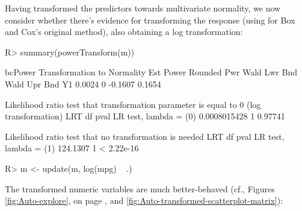 \documentclass[
]{jss}
\begin{document}
Having transformed the predictors towards multivariate normality, we now
consider whether there's evidence for transforming the response (using
 for Box and Cox's original method), also
obtaining a log transformation:

\begin{CodeChunk}
\begin{CodeInput}
R> summary(powerTransform(m))
\end{CodeInput}
\begin{CodeOutput}
bcPower Transformation to Normality 
   Est Power Rounded Pwr Wald Lwr Bnd Wald Upr Bnd
Y1    0.0024           0      -0.1607       0.1654

Likelihood ratio test that transformation parameter is equal to 0
 (log transformation)
                               LRT df    pval
LR test, lambda = (0) 0.0008015428  1 0.97741

Likelihood ratio test that no transformation is needed
                           LRT df       pval
LR test, lambda = (1) 124.1307  1 < 2.22e-16
\end{CodeOutput}
\begin{CodeInput}
R> m <- update(m, log(mpg) ~ .)
\end{CodeInput}
\end{CodeChunk}

The transformed numeric variables are much better-behaved (cf., Figures
\ref{fig:Auto-explore}, on page \pageref{fig:Auto-explore}, and
\ref{fig:Auto-transformed-scatterplot-matrix}):
\end{document}
